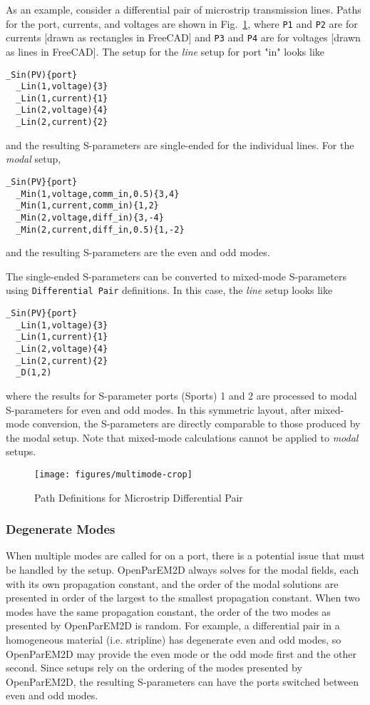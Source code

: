 \documentclass[titlepage]{article}
\renewcommand\_{\textunderscore\linebreak[1]}
\begin{document}
As an example, consider a differential pair of microstrip transmission lines.  Paths for the port, currents, and voltages are shown in Fig.~\ref{fig:diffPair}, where \texttt{\_P1} and \texttt{\_P2} are for currents [drawn as rectangles in FreeCAD] and \texttt{\_P3} and \texttt{\_P4} are for voltages [drawn as lines in FreeCAD].  The setup for the \textit{line} setup for port "in" looks like 
\begin{Verbatim}[fontsize=\small]
  _Sin(PV){port}
  _Lin(1,voltage){3}
  _Lin(1,current){1}
  _Lin(2,voltage){4}
  _Lin(2,current){2}
\end{Verbatim}
\noindent and the resulting S-parameters are single-ended for the individual lines.  For the \textit{modal} setup, 
\begin{Verbatim}[fontsize=\small]
  _Sin(PV}{port}
  _Min(1,voltage,comm_in,0.5){3,4}
  _Min(1,current,comm_in){1,2}
  _Min(2,voltage,diff_in){3,-4}
  _Min(2,current,diff_in,0.5){1,-2}
\end{Verbatim}
\noindent and the resulting S-parameters are the even and odd modes.

The single-ended S-parameters can be converted to mixed-mode S-parameters using \texttt{Differential Pair} definitions.  In this case, the \textit{line} setup looks like
\begin{Verbatim}[fontsize=\small]
  _Sin(PV}{port}
  _Lin(1,voltage){3}
  _Lin(1,current){1}
  _Lin(2,voltage){4}
  _Lin(2,current){2}
  _D(1,2)
\end{Verbatim}
\noindent where the results for S-parameter ports (Sports) 1 and 2 are processed to modal S-parameters for even and odd modes.  In this symmetric layout, after mixed-mode conversion, the S-parameters are directly comparable to those produced by the modal setup.  Note that mixed-mode calculations cannot be applied to \textit{modal} setups.

\begin{figure}
  \centering
  \texttt{[image: figures/multimode-crop]}
  \caption{Path Definitions for Microstrip Differential Pair}
  \label{fig:diffPair} 
\end{figure}

\subsubsection{Degenerate Modes}
\label{sec:degenerate_modes}

When multiple modes are called for on a port, there is a potential issue that must be handled by the setup.  OpenParEM2D always solves for the modal fields, each with its own propagation constant, and the order of the modal solutions are presented in order of the largest to the smallest propagation constant.  When two modes have the same propagation constant, the order of the two modes as presented by OpenParEM2D is random.  For example, a differential pair in a homogeneous material (i.e. stripline) has degenerate even and odd modes, so OpenParEM2D may provide the even mode or the odd mode first and the other second.  Since setups rely on the ordering of the modes presented by OpenParEM2D, the resulting S-parameters can have the ports switched between even and odd modes.
\end{document}
